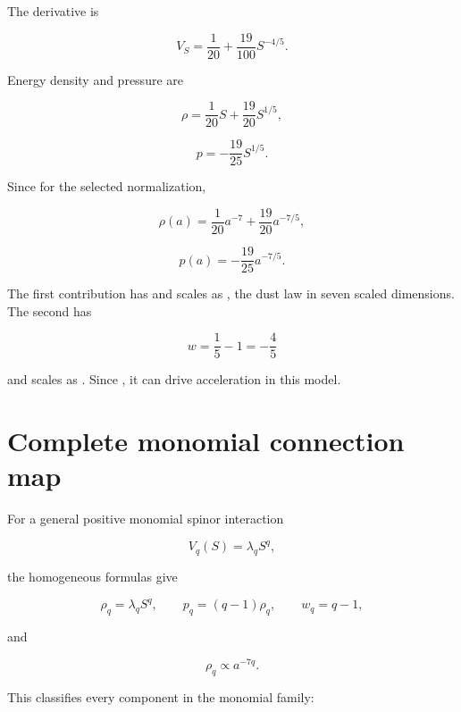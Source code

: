 \documentclass[11pt]{article}
\begin{document}
The derivative is

\[
V_S=\frac1{20}+\frac{19}{100}S^{-4/5}.
\]

Energy density and pressure are

\[
\rho=\frac1{20}S+\frac{19}{20}S^{1/5},
\]

\[
p=-\frac{19}{25}S^{1/5}.
\]

Since \texttt{} for the selected normalization,

\[
\boxed{
\rho(a)=\frac1{20}a^{-7}+\frac{19}{20}a^{-7/5},}
\]

\[
\boxed{
p(a)=-\frac{19}{25}a^{-7/5}.}
\]

The first contribution has \texttt{} and scales as \texttt{}, the dust law in seven scaled dimensions. The second has

\[
w=\frac15-1=-\frac45
\]

and scales as \texttt{}. Since \texttt{}, it can drive acceleration in this model.

\section{Complete monomial connection map}

For a general positive monomial spinor interaction

\[
V_q(S)=\lambda_q S^q,
\]

the homogeneous formulas give

\[
\rho_q=\lambda_qS^q,
\qquad
p_q=(q-1)\rho_q,
\qquad
w_q=q-1,
\]

and

\[
\rho_q\propto a^{-7q}.
\]

This classifies every component in the monomial family:
\end{document}
